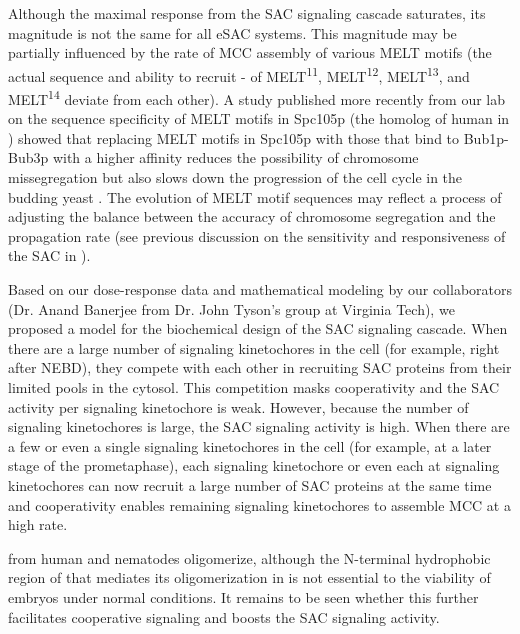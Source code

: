 Although the maximal response from the SAC signaling cascade saturates, its magnitude is not the same for all eSAC systems. This magnitude may be partially influenced by the rate of MCC assembly of various MELT motifs (the actual sequence and ability to recruit - of MELT\textsuperscript{11}, MELT\textsuperscript{12}, MELT\textsuperscript{13}, and MELT\textsuperscript{14} deviate from each other). A study published more recently from our lab on the sequence specificity of MELT motifs in Spc105p (the homolog of human  in ) showed that replacing MELT motifs in Spc105p with those that bind to Bub1p-Bub3p with a higher affinity reduces the possibility of chromosome missegregation but also slows down the progression of the cell cycle in the budding yeast \cite{YeastMELTSpecificity}. The evolution of MELT motif sequences may reflect a process of adjusting the balance between the accuracy of chromosome segregation and the propagation rate \cite{MELTEvolution} (see previous discussion on the sensitivity and responsiveness of the SAC in ).

Based on our dose-response data and mathematical modeling by our collaborators (Dr. Anand Banerjee from Dr. John Tyson's group at Virginia Tech), we proposed a model for the biochemical design of the SAC signaling cascade. When there are a large number of signaling kinetochores in the cell (for example, right after NEBD), they compete with each other in recruiting SAC proteins from their limited pools in the cytosol. This competition masks cooperativity and the SAC activity per signaling kinetochore is weak. However, because the number of signaling kinetochores is large, the SAC signaling activity is high. When there are a few or even a single signaling kinetochores in the cell (for example, at a later stage of the prometaphase), each signaling kinetochore or even each  at signaling kinetochores can now recruit a large number of SAC proteins at the same time and cooperativity enables remaining signaling kinetochores to assemble MCC at a high rate.

 from human and nematodes \cite{WormKnl1Oligomer,Knl1CTer} oligomerize, although the N-terminal hydrophobic region of  that mediates its oligomerization in  is not essential to the viability of embryos under normal conditions. It remains to be seen whether this further facilitates cooperative signaling and boosts the SAC signaling activity.

